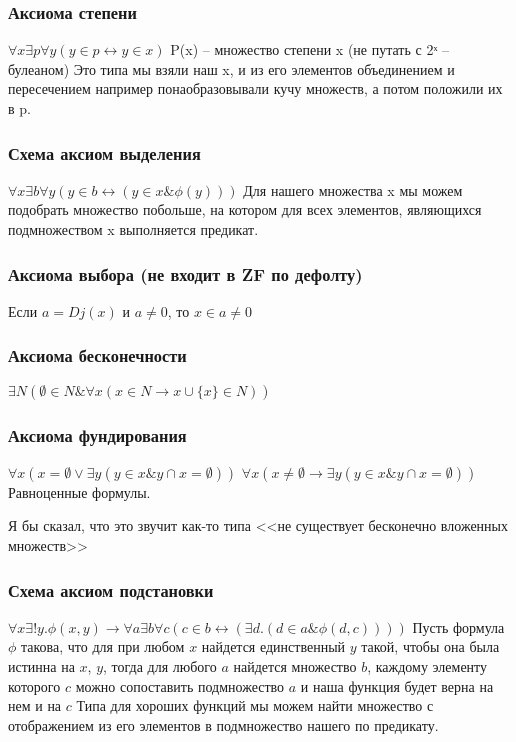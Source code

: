 \subsubsection{Аксиома степени}
\label{sec-2-40-4}
$\forall x \exists p \forall y(y \in p \leftrightarrow y \in x)$
P(x) -- множество степени x (не путать с 2ˣ -- булеаном)
Это типа мы взяли наш x, и из его элементов объединением и
пересечением например понаобразовывали кучу множеств, а потом
положили их в p.
\subsubsection{Схема аксиом выделения}
\label{sec-2-40-5}
$\forall x \exists b\forall y(y \in b \leftrightarrow (y \in x \& \phi(y)))$
Для нашего множества x мы можем подобрать множество побольше,
на котором для всех элементов, являющихся подмножеством x
выполняется предикат.
\subsubsection{Аксиома выбора (не входит в ZF по дефолту)}
\label{sec-2-40-6}
Если $a = Dj(x)$ и $a \ne  0$, то $x \in a \ne  0$
\subsubsection{Аксиома бесконечности}
\label{sec-2-40-7}
$\exists N(\emptyset \in N \& \forall x(x \in N \to x \cup \{x\} \in N))$
\subsubsection{Аксиома фундирования}
\label{sec-2-40-8}
$\forall x(x = \emptyset \lor \exists y(y \in x \& y \cap x = \emptyset))$
$\forall x(x \ne  \emptyset \to \exists y(y \in x \& y \cap x = \emptyset))$
Равноценные формулы.

Я бы сказал, что это звучит как-то типа
<<не существует бесконечно вложенных множеств>>
\subsubsection{Схема аксиом подстановки}
\label{sec-2-40-9}
$\forall x \exists !y.\phi(x,y) \to \forall a\exists b\forall c(c \in b \leftrightarrow (\exists d.(d \in a \& \phi(d, c))))$
Пусть формула $\phi$ такова, что для при любом $x$ найдется единственный $y$
такой, чтобы она была истинна на $x$, $y$, тогда для любого $a$
найдется множество $b$, каждому элементу которого $c$ можно сопоставить
подмножество $a$ и наша функция будет верна на нем и на $c$
Типа для хороших функций мы можем найти множество с отображением из
его элементов в подмножество нашего по предикату.

